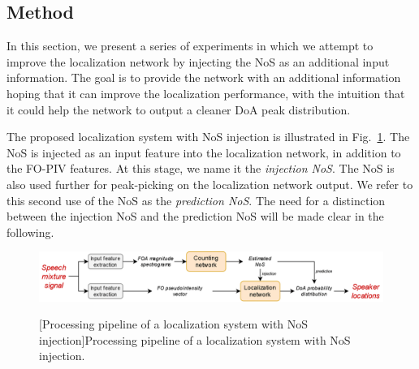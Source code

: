 \subsection{Method}
\label{ss:nosInjectionMethod}

In this section, we present a series of experiments in which we attempt to improve the localization network by injecting the NoS as an additional input information. The goal is to provide the network with an additional information hoping that it can improve the localization performance, with the intuition that it could help the network to output a cleaner DoA peak distribution. 

The proposed localization system with NoS injection is illustrated in Fig.~\ref{fig:nosInjectionPipeline}. The NoS is injected as an input feature into the localization network, in addition to the FO-PIV features. At this stage, we name it the \textit{injection NoS}. The NoS is also used further for peak-picking on the localization network output. We refer to this second use of the NoS as the \textit{prediction NoS}. The need for a distinction between the injection NoS and the prediction NoS will be made clear in the following.

\begin{figure}[t]
    \begin{adjustbox}{width=1.2\textwidth,center}
        \includegraphics[width=1.\linewidth]{Images/chap8/nosInjectionPipeline.png}
    \end{adjustbox}
    [Processing pipeline of a localization system with NoS injection]{Processing pipeline of a localization system with NoS injection.}
    \label{fig:nosInjectionPipeline}
\end{figure}

